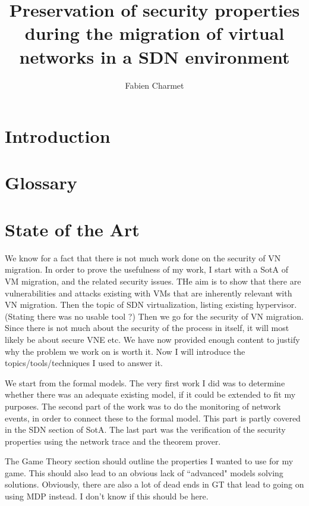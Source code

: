 \documentclass[a4paper, 11pt]{article}
\title{\LARGE \bf Preservation of security properties during the migration of virtual networks in a SDN environment}
\author{Fabien Charmet}
\begin{document}
\noindent



\maketitle
\tableofcontents
\thispagestyle{empty}

\begin{abstract}

\end{abstract}

\section{Introduction}

\section{Glossary}



\section{State of the Art}
We know for a fact that there is not much work done on the security of VN migration.
In order to prove the usefulness of my work, I start with a SotA of VM migration, and the related security issues.
THe aim is to show that there are vulnerabilities and attacks existing with VMs that are inherently relevant with VN migration.
Then the topic of SDN virtualization, listing existing hypervisor. (Stating there was no usable tool ?)
Then we go for the security of VN migration. Since there is not much about the security of the process in itself, it will most likely be about secure VNE etc.
We have now provided enough content to justify why the problem we work on is worth it.
Now I will introduce the topics/tools/techniques I used to answer it.

We start from the formal models. The very first work I did was to determine whether there was an adequate existing model, if it could be extended to fit my purposes. 
The second part of the work was to do the monitoring of network events, in order to connect these to the formal model. This part is partly covered in the SDN section of SotA.
The last part was the verification of the security properties using the network trace and the theorem prover.

The Game Theory section should outline the properties I wanted to use for my game. This should also lead to an obvious lack of ``advanced" models solving solutions. Obviously, there are also a lot of dead ends in GT that lead to going on using MDP instead. I don't know if this should be here.
\end{document}
